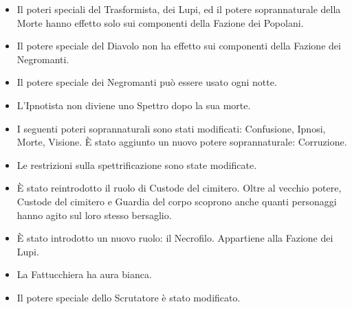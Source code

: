 \documentclass[a4paper,10pt]{article}
\begin{document}
\begin{itemize}
	\item Il poteri speciali del Trasformista, dei Lupi, ed il potere soprannaturale della Morte hanno effetto solo sui componenti della Fazione dei Popolani.
 	\item Il potere speciale del Diavolo non ha effetto sui componenti della Fazione dei Negromanti.
 	\item Il potere speciale dei Negromanti può essere usato ogni notte.
 	\item L'Ipnotista non diviene uno Spettro dopo la sua morte.
 	\item I seguenti poteri soprannaturali sono stati modificati: Confusione, Ipnosi, Morte, Visione. È stato aggiunto un nuovo potere soprannaturale: Corruzione.
 	\item Le restrizioni sulla spettrificazione sono state modificate.
 	\item È stato reintrodotto il ruolo di Custode del cimitero. Oltre al vecchio potere, Custode del cimitero e Guardia del corpo scoprono anche quanti personaggi hanno agito sul loro stesso bersaglio.
 	\item È stato introdotto un nuovo ruolo: il Necrofilo. Appartiene alla Fazione dei Lupi.
 	\item La Fattucchiera ha aura bianca.
 	\item Il potere speciale dello Scrutatore è stato modificato.
\end{itemize}
\end{document}

